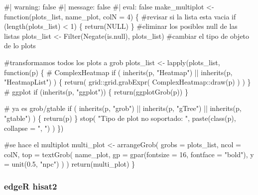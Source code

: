 \documentclass[
  10pt,
]{article}
\newenvironment{Shaded}{\begin{snugshade}}{\end{snugshade}}
\newcommand{\NormalTok}[1]{\textcolor[rgb]{0.00,0.23,0.31}{#1}}
\begin{document}
\begin{Shaded}
\begin{Highlighting}[]
\NormalTok{\#| warning: false}
\NormalTok{\#| message: false}
\NormalTok{\#| eval: false}
\NormalTok{make\_multiplot \textless{}{-} function(plots\_list, name\_plot, colN = 4) \{}
\NormalTok{  \#revisar si la lista esta vacia}
\NormalTok{  if (length(plots\_list) \textless{} 1) \{}
\NormalTok{    return(NULL)}
\NormalTok{  \}}
\NormalTok{  \#eliminar los posibles null de las listas}
\NormalTok{  plots\_list \textless{}{-} Filter(Negate(is.null), plots\_list)}
\NormalTok{  \#cambiar el tipo de objeto de lo plots}

\NormalTok{  \#transformamos todos los plots a grob}
\NormalTok{  plots\_list \textless{}{-} lapply(plots\_list, function(p) \{}
\NormalTok{    \# ComplexHeatmap}
\NormalTok{    if (}
\NormalTok{      inherits(p, "Heatmap") ||}
\NormalTok{        inherits(p, "HeatmapList")}
\NormalTok{    ) \{}
\NormalTok{      return(}
\NormalTok{        grid::grid.grabExpr(}
\NormalTok{          ComplexHeatmap::draw(p)}
\NormalTok{        )}
\NormalTok{      )}
\NormalTok{    \}}
\NormalTok{    \# ggplot}
\NormalTok{    if (inherits(p, "ggplot")) \{}
\NormalTok{      return(ggplotGrob(p))}
\NormalTok{    \}}

\NormalTok{    \# ya es grob/gtable}
\NormalTok{    if (}
\NormalTok{      inherits(p, "grob") ||}
\NormalTok{        inherits(p, "gTree") ||}
\NormalTok{        inherits(p, "gtable")}
\NormalTok{    ) \{}
\NormalTok{      return(p)}
\NormalTok{    \}}
\NormalTok{    stop(}
\NormalTok{      "Tipo de plot no soportado: ",}
\NormalTok{      paste(class(p), collapse = ", ")}
\NormalTok{    )}
\NormalTok{  \})}

\NormalTok{  \#se hace el multiplot}
\NormalTok{  multi\_plot \textless{}{-} arrangeGrob(}
\NormalTok{    grobs = plots\_list,}
\NormalTok{    ncol = colN,}
\NormalTok{    top = textGrob(}
\NormalTok{      name\_plot,}
\NormalTok{      gp = gpar(fontsize = 16, fontface = "bold"),}
\NormalTok{      y = unit(0.5, "npc")}
\NormalTok{    )}
\NormalTok{  )}
\NormalTok{  return(multi\_plot)}
\NormalTok{\}}
\end{Highlighting}
\end{Shaded}

\subsubsection{edgeR hisat2}\label{edger-hisat2}
\end{document}
